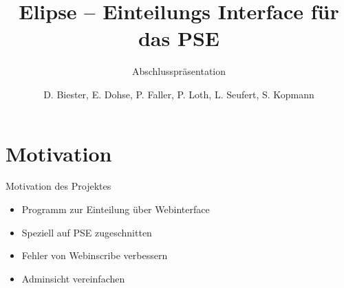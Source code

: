 \documentclass[18pt]{beamer}
\title[Elipse]{Elipse -- Einteilungs Interface für das PSE}
\subtitle{Abschlusspräsentation}
\author{D. Biester, E. Dohse, P. Faller, P. Loth, L. Seufert, S. Kopmann}
\institute{IPD Snelting}
\begin{document}

\begin{frame}
\titlepage
\end{frame}


\section{Motivation}
\begin{frame}{Motivation des Projektes}
\begin{itemize}
\item Programm zur Einteilung über Webinterface
\item Speziell auf PSE zugeschnitten
\item Fehler von Webinscribe verbessern
\item Adminsicht vereinfachen
\end{itemize}
\end{frame}

\end{document}
